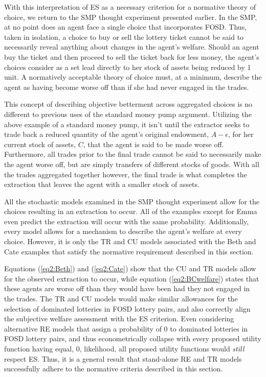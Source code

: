 \documentclass[../main.tex]{subfiles}
\begin{document}
With this interpretation of ES as a necessary criterion for a normative theory of choice, we return to the SMP thought experiment presented earlier.
In the SMP, at no point does an agent face a single choice that incorporates FOSD.
Thus, taken in isolation, a choice to buy or sell the lottery ticket cannot be said to necessarily reveal anything about changes in the agent's welfare.
Should an agent buy the ticket and then proceed to sell the ticket back for less money, the agent's choices consider as a set lead directly to her stock of assets being reduced by 1 unit.
A normatively acceptable theory of choice must, at a minimum, describe the agent as having become worse off than if she had never engaged in the trades.

This concept of describing objective betterment across aggregated choices is no different to previous uses of the standard money pump argument.
Utilizing the above example of a standard money pump, it isn't until the extractor seeks to trade back a reduced quantity of the agent's original endowment, $A - \epsilon$, for her current stock of assets, $C$, that the agent is said to be made worse off.
Furthermore, all trades prior to the final trade cannot be said to necessarily make the agent worse off, but are simply transfers of different stocks of goods.
With all the trades aggregated together however, the final trade is what completes the extraction that leaves the agent with a smaller stock of assets.

All the stochastic models examined in the SMP thought experiment allow for the choices resulting in an extraction to occur.
All of the examples except for Emma even predict the extraction will occur with the same probability.
Additionally, every model allows for a mechanism to describe the agent's welfare at every choice.
However, it is only the TR and CU models associated with the Beth and Cate examples that satisfy the normative requirement described in this section.

Equations (\ref{eq2:Beth}) and (\ref{eq2:Cate}) show that the CU and TR models allow for the observed extraction to occur, while equation (\ref{eq2:BCwelfare}) states that these agents are worse off than they would have been had they not engaged in the trades.
The TR and CU models would make similar allowances for the selection of dominated lotteries in FOSD lottery pairs, and also correctly align the subjective welfare assessment with the ES criterion.
Even considering alternative RE models that assign a probability of $0$ to dominated lotteries in FOSD lottery pairs, and thus econometrically collapse with every proposed utility function having equal, $0$, likelihood, all proposed utility functions would \textit{still} respect ES.
Thus, it is a general result that stand-alone RE and TR models successfully adhere to the normative criteria described in this section.
\end{document}

